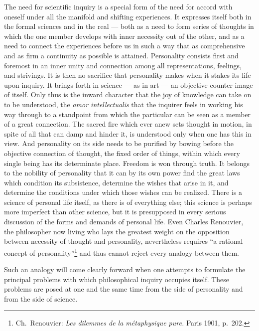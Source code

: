 \documentclass[12pt,a4paper]{book}
\newcommand{\opage}[1]{\marginnote{\footnotesize\textit{[#1]}}}
\begin{document}
The need for scientific inquiry is a special form of the need for accord with
oneself under all the manifold and shifting experiences. It expresses itself both
in the formal sciences and in the real --- both as a need to form series of
thoughts in which the one member develops with inner necessity out of the other,
and as a need to connect the experiences before us in such a way that as
comprehensive and as firm a continuity as possible is attained. Personality
consists first and foremost in an inner unity and connection among all
representations, feelings, and strivings. It is then no sacrifice that
personality makes when it stakes its life upon inquiry. It brings forth in
science --- as in art --- an objective counter-image of itself. Only thus is
the inward character that the joy of knowledge can take on to be understood, the
\textit{amor intellectualis} that the inquirer feels in working his way through
to a standpoint from which the particular can be seen as a member of a great
connection. The sacred fire which ever anew sets thought in motion, in spite of
all that can damp and hinder it, is understood only when one has this in view.
And personality on its side needs to be purified by bowing before the objective
connection of thought, the fixed order of things, within which every single
being has its determinate place. Freedom is won through truth. It belongs to the
nobility of personality that it can by its own power find the great laws which
condition its subsistence, determine the wishes that arise in it, and determine
the conditions under which those wishes can be realized. There is a science of
personal life itself, as there is of everything else; this science is perhaps
more imperfect than other science, but it is presupposed in every serious
discussion of the forms and demands of personal life. Even Charles Renouvier,
the philosopher now living who lays the greatest weight on the opposition
between necessity of thought and personality, nevertheless requires ``a rational
concept of personality''\footnote{\opage{85}Ch.~Renouvier: \textit{Les dilemmes de la
métaphysique pure.} Paris 1901, p.~202.} and thus cannot reject every analogy
between them.

\opage{3}Such an analogy will come clearly forward when one attempts to formulate the
principal problems with which philosophical inquiry occupies itself. These
problems are posed at one and the same time from the side of personality and
from the side of science.
\end{document}

